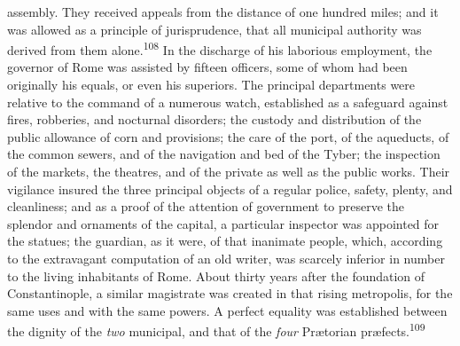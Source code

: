 assembly. They received appeals from the distance of one hundred
miles; and it was allowed as a principle of jurisprudence, that
all municipal authority was derived from them alone.\textsuperscript{108} In the
discharge of his laborious employment, the governor of Rome was
assisted by fifteen officers, some of whom had been originally
his equals, or even his superiors. The principal departments were
relative to the command of a numerous watch, established as a
safeguard against fires, robberies, and nocturnal disorders; the
custody and distribution of the public allowance of corn and
provisions; the care of the port, of the aqueducts, of the common
sewers, and of the navigation and bed of the Tyber; the
inspection of the markets, the theatres, and of the private as
well as the public works. Their vigilance insured the three
principal objects of a regular police, safety, plenty, and
cleanliness; and as a proof of the attention of government to
preserve the splendor and ornaments of the capital, a particular
inspector was appointed for the statues; the guardian, as it
were, of that inanimate people, which, according to the
extravagant computation of an old writer, was scarcely inferior
in number to the living inhabitants of Rome. About thirty years
after the foundation of Constantinople, a similar magistrate was
created in that rising metropolis, for the same uses and with the
same powers. A perfect equality was established between the
dignity of the \textit{two} municipal, and that of the \textit{four} Prætorian
præfects.\textsuperscript{109}



